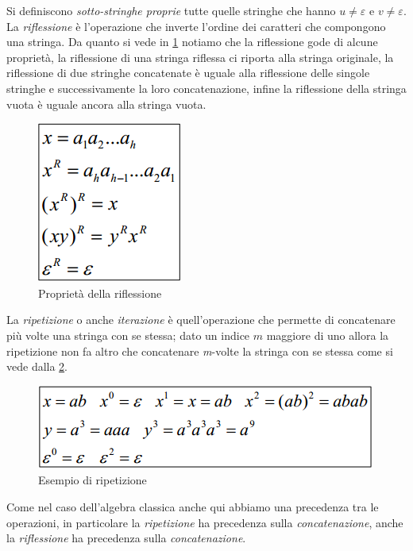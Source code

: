 Si definiscono \emph{sotto-stringhe proprie} tutte quelle stringhe che hanno $u\neq \varepsilon$ e $v \neq \varepsilon$.\\
La \emph{riflessione} è l'operazione che inverte l'ordine dei caratteri che compongono una stringa. Da quanto si vede in \figurename \ref{fig:riflessione} notiamo che la riflessione gode di alcune proprietà, la riflessione di una stringa riflessa ci riporta alla stringa originale, la riflessione di due stringhe concatenate è uguale alla riflessione delle singole stringhe e successivamente la loro concatenazione, infine la riflessione della stringa vuota è uguale ancora alla stringa vuota.
\begin{figure}
	\centering
	\includegraphics[width=0.3\linewidth]{img/riflessione.png}
	\caption{Proprietà della riflessione}\label{fig:riflessione}
\end{figure}
La \emph{ripetizione} o anche \emph{iterazione} è quell'operazione che permette di concatenare più volte una stringa con se stessa; dato un indice $ m $ maggiore di uno allora la ripetizione non fa altro che concatenare \emph{m}-volte la stringa con se stessa come si vede dalla \figurename \ref{fig:ripetizione}.
\begin{figure}
	\centering
	\includegraphics[width=0.65\linewidth]{img/ripetizione.png}
	\caption{Esempio di ripetizione}\label{fig:ripetizione}
\end{figure}
Come nel caso dell'algebra classica anche qui abbiamo una precedenza tra le operazioni, in particolare la \emph{ripetizione} ha precedenza sulla \emph{concatenazione}, anche la \emph{riflessione} ha precedenza sulla \emph{concatenazione}.\\
